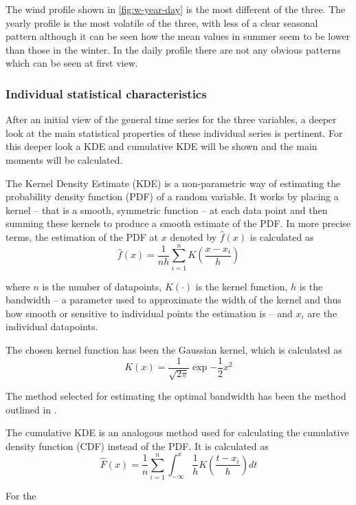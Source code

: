 The wind profile shown in \autoref{fig:w-year-day} is the most different of the three. The yearly profile is the most volatile of the three, with less of a clear seasonal pattern although it can be seen how the mean values in summer seem to be lower than those in the winter. In the daily profile there are not any obvious patterns which can be seen at first view. 

\subsubsection{Individual statistical characteristics}
After an initial view of the general time series for the three variables, a deeper look at the main statistical properties of these individual series is pertinent. For this deeper look a KDE and cumulative KDE will be shown and the main moments will be calculated. 

The Kernel Density Estimate (KDE) is a non-parametric way of estimating the probability density function (PDF) of a random variable. It works by placing a kernel -- that is a smooth, symmetric function -- at each data point and then summing these kernels to produce a smooth estimate of the PDF. In more precise terms, the estimation of the PDF at $x$ denoted by $\hat{f}\left(x\right)$ is calculated as
\begin{equation}
    \hat{f}\left(x\right)=\frac{1}{nh}\sum^n_{i=1}K\left(\frac{x-x_i}{h}\right)
\end{equation}

where $n$ is the number of datapoints, $K\left(\cdot\right)$ is the kernel function, $h$ is the bandwidth -- a parameter used to approximate the width of the kernel and thus how smooth or sensitive to individual points the estimation is -- and $x_i$ are the individual datapoints.

The chosen kernel function has been the Gaussian kernel, which is calculated as 
\begin{equation}
    K\left(x\right)=\frac{1}{\sqrt{2\pi}}\exp{-\frac{1}{2}x^2}
\end{equation}

The method selected for estimating the optimal bandwidth has been the method outlined in \cite{scott_1979}. 

The cumulative KDE is an analogous method used for calculating the cumulative density function (CDF) instead of the PDF. It is calculated as
\begin{equation}
    \hat{F}\left(x\right)=\frac{1}{n}\sum^n_{i=1}\int_{-\infty}^{x}\frac{1}{h}K\left(\frac{t-x_i}{h}\right)dt
\end{equation}

For the 